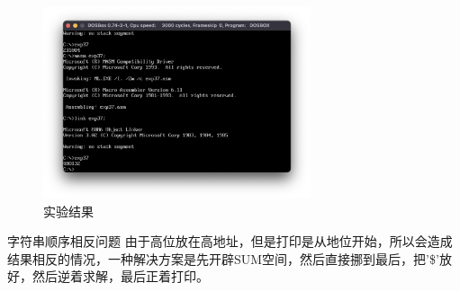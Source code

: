 \documentclass[11pt]{SEU-Digital-Report}
\begin{document}
\begin{figure}[htbp]
    \centering
    \includegraphics[width=0.7\textwidth]{fig/rlt7.png}
    \caption{实验结果}
    \label{fig:rlt7}
\end{figure}

\begin{note}{字符串顺序相反问题}{}
    由于高位放在高地址，但是打印是从地位开始，所以会造成结果相反的情况，一种解决方案是先开辟SUM空间，然后直接挪到最后，把'\$'放好，然后逆着求解，最后正着打印。
\end{note}
\end{document}
